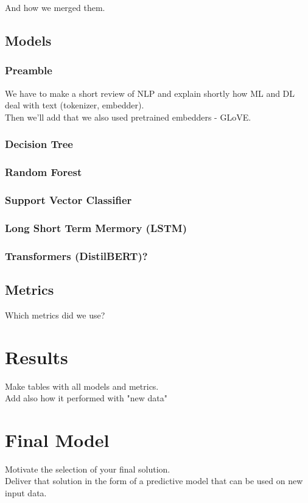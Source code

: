 \documentclass[11pt,a4paper]{article}
\begin{document}
And how we merged them.

\subsection{Models}

\subsubsection{Preamble}
We have to make a short review of NLP and explain shortly how ML and DL deal with text (tokenizer, embedder).\\Then we'll add that we also used pretrained embedders - GLoVE. 

\subsubsection{Decision Tree}

\subsubsection{Random Forest}

\subsubsection{Support Vector Classifier}

\subsubsection{Long Short Term Mermory (LSTM)}

\subsubsection{Transformers (DistilBERT)?}

\subsection{Metrics}
Which metrics did we use?

\pagebreak
\section{Results}
Make tables with all models and metrics.\\
Add also how it performed with "new data"

\pagebreak
\section{Final Model}
Motivate the selection of your final solution.\\
Deliver that solution in the form of a predictive model that can be used on new input
data.
\end{document}
